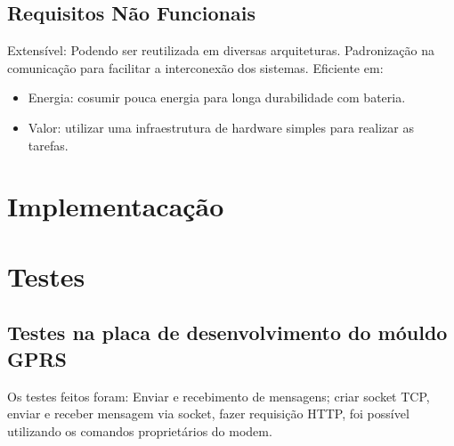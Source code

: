 \subsection{Requisitos N\~ao Funcionais}{

Extens\'ivel: Podendo ser reutilizada em diversas arquiteturas.
Padroniza\c{c}\~ao na comunica\c{c}\~ao para facilitar a interconex\~ao dos sistemas.
Eficiente em:
    \begin{itemize}
        \item Energia: cosumir pouca energia para longa durabilidade com bateria.
        \item Valor: utilizar uma infraestrutura de hardware simples para realizar as tarefas.
    \end{itemize}
}

\section{Implementaca\c{c}\~ao}
\section{Testes}
\subsection{Testes na placa de desenvolvimento do m\'ouldo GPRS}{
    Os testes feitos foram: Enviar e recebimento de mensagens; criar socket TCP, enviar e receber mensagem via socket, fazer requisi\c{c}\~ao HTTP, foi poss\'ivel utilizando os comandos propriet\'arios do modem.}
